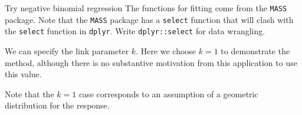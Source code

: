 \documentclass[
  ignorenonframetext,
]{beamer}
\begin{document}
\begin{frame}{Try negative binomial regression}
\protect\hypertarget{try-negative-binomial-regression}{}
The functions for fitting come from the \texttt{MASS} package. Note that
the \texttt{MASS} package has a \texttt{select} function that will clash
with the \texttt{select} function in \texttt{dplyr}. Write
\texttt{dplyr::select} for data wrangling.

\vspace{12pt}

We can specify the link parameter \(k\). Here we choose \(k = 1\) to
demonstrate the method, although there is no substantive motivation from
this application to use this value.

\vspace{12pt}

Note that the \(k = 1\) case corresponds to an assumption of a geometric
distribution for the response.
\end{frame}
\end{document}
